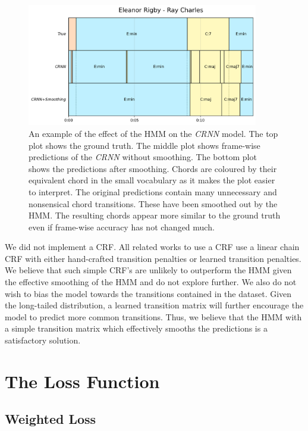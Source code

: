 \begin{figure}[H]
    \centering
    \hspace{-1.5cm}
    \includegraphics[width=0.9\textwidth]{figures/hmm_smoothing_example.png}
    \caption{An example of the effect of the HMM on the \emph{CRNN} model. The top plot shows the ground truth. The middle plot shows frame-wise predictions of the \emph{CRNN} without smoothing. The bottom plot shows the predictions after smoothing. Chords are coloured by their equivalent chord in the small vocabulary as it makes the plot easier to interpret. The original predictions contain many unnecessary and nonsensical chord transitions. These have been smoothed out by the HMM. The resulting chords appear more similar to the ground truth even if frame-wise accuracy has not changed much.}\label{fig:hmm_smoothing_example}
\end{figure}

We did not implement a CRF. All related works to use a CRF use a linear chain CRF with either hand-crafted transition penalties or learned transition penalties. We believe that such simple CRF's are unlikely to outperform the HMM given the effective smoothing of the HMM and do not explore further. We also do not wish to bias the model towards the transitions contained in the dataset. Given the long-tailed distribution, a learned transition matrix will further encourage the model to predict more common transitions. Thus, we believe that the HMM with a simple transition matrix which effectively smooths the predictions is a satisfactory solution.

\section{The Loss Function}

\subsection{Weighted Loss}\label{sec:weighted_loss}


